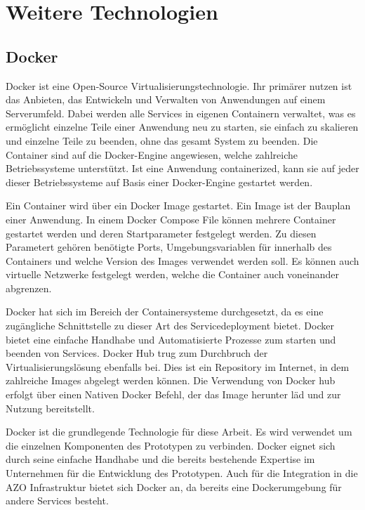 \documentclass[a4paper, 12pt, oneside, toc=listofnumbered, bibliography=totoc]{scrbook}
\begin{document}

	\section{Weitere Technologien}
		\subsection{Docker}
		
		Docker ist eine Open-Source Virtualisierungstechnologie. Ihr primärer nutzen ist das Anbieten, das Entwickeln und Verwalten von Anwendungen auf einem Serverumfeld. Dabei werden alle Services in eigenen Containern verwaltet, was es ermöglicht einzelne Teile einer Anwendung neu zu starten, sie einfach zu skalieren und einzelne Teile zu beenden, ohne das gesamt System zu beenden. Die Container sind auf die Docker-Engine angewiesen, welche zahlreiche Betriebssysteme unterstützt. Ist eine Anwendung containerized, kann sie auf jeder dieser Betriebssysteme auf Basis einer Docker-Engine gestartet werden. \cite{noauthor_install_2023}
		
		Ein Container wird über ein Docker Image gestartet. Ein Image ist der Bauplan einer Anwendung. In einem Docker Compose File können mehrere Container gestartet werden und deren Startparameter festgelegt werden. Zu diesen Parametert gehören benötigte Ports, Umgebungsvariablen für innerhalb des Containers und welche Version des Images verwendet werden soll. Es können auch virtuelle Netzwerke festgelegt werden, welche die Container auch voneinander abgrenzen. 
		
		Docker hat sich im Bereich der Containersysteme durchgesetzt, da es eine zugängliche Schnittstelle zu dieser Art des Servicedeployment bietet. Docker bietet eine einfache Handhabe und Automatisierte Prozesse zum starten und beenden von Services. Docker Hub trug zum Durchbruch der Virtualisierungslösung ebenfalls bei. Dies ist ein Repository im Internet, in dem zahlreiche Images abgelegt werden können. Die Verwendung von Docker hub erfolgt über einen Nativen Docker Befehl, der das Image herunter läd und zur Nutzung bereitstellt. 
		
		Docker ist die grundlegende Technologie für diese Arbeit. Es wird verwendet um die einzelnen Komponenten des Prototypen zu verbinden. Docker eignet sich durch seine einfache Handhabe und die bereits bestehende Expertise im Unternehmen für die Entwicklung des Prototypen. Auch für die Integration in die AZO Infrastruktur bietet sich Docker an, da bereits eine Dockerumgebung für andere Services besteht. 
		
\end{document}
